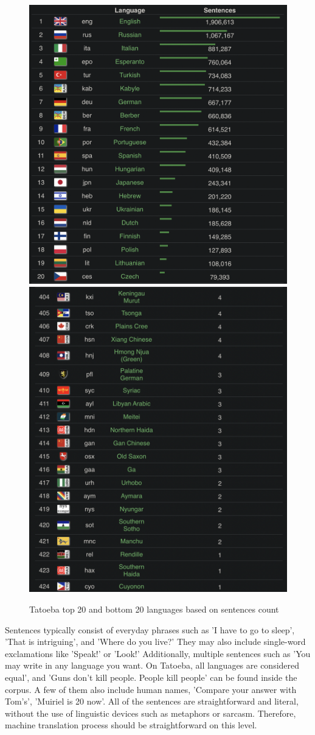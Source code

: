 \documentclass[a4paper]{article}
\begin{document}
\begin{figure}[htbp]
    \centering
    \includegraphics[width=0.5\linewidth]{images/tatoeba_top_20_lang.png}
    \includegraphics[width=0.46\linewidth]{images/tatoeba_bottom_20_lang.png}
    \caption{Tatoeba top 20 and bottom 20 languages based on sentences count \cite{tatoeba}}
    \label{fig:tatoeba_top_bottom_languages}
\end{figure}

Sentences typically consist of everyday phrases such as 'I have to go to sleep', 'That is intriguing', and 'Where do you live?' They may also include single-word exclamations like 'Speak!' or 'Look!' Additionally, multiple sentences such as 'You may write in any language you want. On Tatoeba, all languages are considered equal', and 'Guns don't kill people. People kill people' can be found inside the corpus. A few of them also include human names, 'Compare your answer with Tom's', 'Muiriel is 20 now'. All of the sentences are straightforward and literal, without the use of linguistic devices such as metaphors or sarcasm. Therefore, machine translation process should be straightforward on this level.
\end{document}
